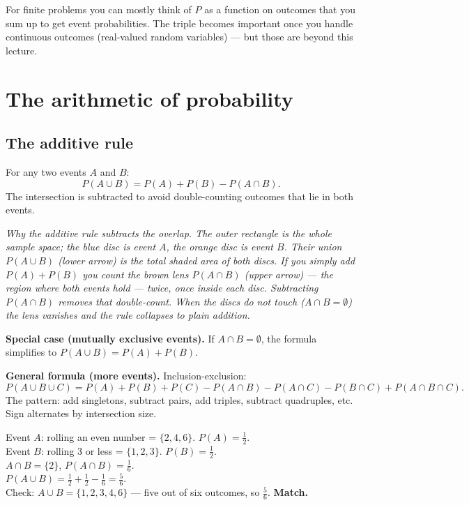 \documentclass[11pt, a4paper]{article}
\begin{document}
For finite problems you can mostly think of $P$ as a function on outcomes that you sum up to get event probabilities. The triple becomes important once you handle continuous outcomes (real-valued random variables) — but those are beyond this lecture.

\section{The arithmetic of probability}

\subsection{The additive rule}

\begin{defbox}
For any two events $A$ and $B$:
\[
P(A \cup B) = P(A) + P(B) - P(A \cap B).
\]
The intersection is subtracted to avoid double-counting outcomes that lie in both events.
\end{defbox}

\begin{center}

\footnotesize\textit{Why the additive rule subtracts the overlap. The outer rectangle is the whole sample space; the blue disc is event $A$, the orange disc is event $B$. Their union $P(A \cup B)$ (lower arrow) is the total shaded area of both discs. If you simply add $P(A) + P(B)$ you count the brown lens $P(A \cap B)$ (upper arrow) — the region where both events hold — \emph{twice}, once inside each disc. Subtracting $P(A \cap B)$ removes that double-count. When the discs do not touch ($A \cap B = \emptyset$) the lens vanishes and the rule collapses to plain addition.}
\end{center}

\textbf{Special case (mutually exclusive events).} If $A \cap B = \emptyset$, the formula simplifies to $P(A \cup B) = P(A) + P(B)$.

\textbf{General formula (more events).} Inclusion-exclusion:
\[
P(A \cup B \cup C) = P(A) + P(B) + P(C) - P(A \cap B) - P(A \cap C) - P(B \cap C) + P(A \cap B \cap C).
\]
The pattern: add singletons, subtract pairs, add triples, subtract quadruples, etc. Sign alternates by intersection size.

\begin{exbox}
Event $A$: rolling an even number = $\{2, 4, 6\}$. $P(A) = \frac{1}{2}$.\\
Event $B$: rolling 3 or less = $\{1, 2, 3\}$. $P(B) = \frac{1}{2}$.\\
$A \cap B = \{2\}$, $P(A \cap B) = \frac{1}{6}$.\\
$P(A \cup B) = \frac{1}{2} + \frac{1}{2} - \frac{1}{6} = \frac{5}{6}$.\\[0.3em]
Check: $A \cup B = \{1, 2, 3, 4, 6\}$ — five out of six outcomes, so $\frac{5}{6}$. \textbf{Match.}
\end{exbox}
\end{document}

